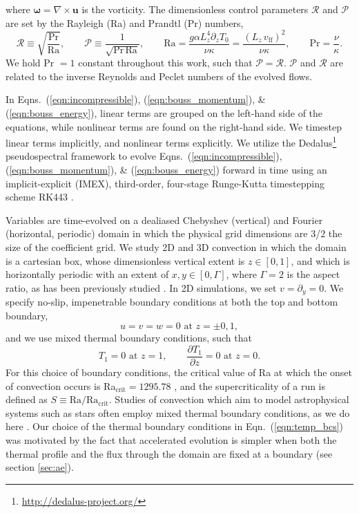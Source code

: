 \documentclass[aps, pre, onecolumn, nofootinbib, notitlepage, groupedaddress, amsfonts, amssymb, amsmath, longbibliography]{revtex4-1}
\newcommand{\grad}{\ensuremath{\nabla}}
\begin{document}
where $\bm{\omega} = \grad \times \bm{u}$ is the vorticity.
The dimensionless control parameters $\mathcal{R}$ and $\mathcal{P}$ 
are set by the Rayleigh (Ra) and Prandtl (Pr) numbers,
\begin{equation}
\mathcal{R} \equiv \sqrt{\frac{\text{Pr}}{\text{Ra}}}, \qquad \mathcal{P} \equiv \frac{1}{\sqrt{\text{Pr}\,\text{Ra}}}, \qquad
\text{Ra} = \frac{g \alpha L_z^4 \partial_z T_0}{\nu\kappa} = \frac{(L_z\,v_{\text{ff}})^2}{\nu\kappa}, \qquad \text{Pr} = \frac{\nu}{\kappa}.
\end{equation}
We hold Pr $= 1$ constant throughout this work, such that $\mathcal{P} = \mathcal{R}$.
$\mathcal{P}$ and $\mathcal{R}$ are related to the inverse Reynolds and Peclet numbers of the
evolved flows.

In Eqns.~(\ref{eqn:incompressible}), (\ref{eqn:bouss_momentum}), \& (\ref{eqn:bouss_energy}),
linear terms are grouped on the left-hand side of the equations, while nonlinear terms
are found on the right-hand side. We timestep linear terms implicitly, and nonlinear
terms explicitly.
We utilize the 
Dedalus\footnote{\url{http://dedalus-project.org/}} 
pseudospectral framework \cite{burns&all2016} to evolve  
Eqns.~(\ref{eqn:incompressible}), (\ref{eqn:bouss_momentum}), \& (\ref{eqn:bouss_energy}) 
forward in time
using an implicit-explicit (IMEX), third-order, four-stage 
Runge-Kutta timestepping scheme RK443 \cite{ascher&all1997}.  

Variables are time-evolved on a dealiased Chebyshev (vertical)
and Fourier (horizontal, periodic) domain in which the
physical grid dimensions are 3/2 the size of the coefficient grid.  
We study 2D and 3D convection in which the domain is a cartesian box, 
whose dimensionless vertical extent is $z \in [0, 1]$, 
and which is horizontally periodic with an extent of $x, y \in [0, \Gamma]$,
where $\Gamma = 2$ is the aspect ratio, as has been previously studied
\cite{goluskin&all2014, johnston&doering2009}. 
In 2D simulations, we set $v = \partial_y = 0$.
We specify no-slip, impenetrable boundary conditions at both the top and
bottom boundary,
\begin{equation}
u = v = w = 0 \, \, \text{at}\,\,z = \pm 0,1,
\label{eqn:vel_bcs}
\end{equation}
and we use mixed thermal boundary conditions, such that
\begin{equation}
T_1 = 0 \,\,\text{at}\,\, z=1, \qquad
\frac{\partial T_1}{\partial z} = 0\,\,\text{at}\,\,z=0.
\label{eqn:temp_bcs}
\end{equation}
For this choice of boundary conditions, the critical value of Ra at which
the onset of convection occurs is Ra$_{\text{crit}} = 1295.78$ \cite{goluskin2016}, and the
supercriticality of a run is defined as $S \equiv \text{Ra}/\text{Ra}_{\text{crit}}$.
Studies of convection which aim to model
astrophysical systems such as stars often employ mixed thermal
boundary conditions, as we do here \cite{hurlburt&all1984, cattaneo&all1991, korre&all2017}.
Our choice of the thermal boundary conditions in Eqn.~(\ref{eqn:temp_bcs}) 
was motivated by the fact that accelerated evolution is simpler when both the
thermal profile and the flux through the domain are fixed at a boundary 
(see section \ref{sec:ae}).
\end{document}
